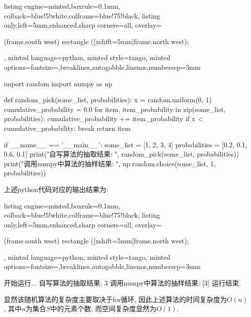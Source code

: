 \documentclass{article}
\begin{document}
\begin{homeworkProblem}
\begin{tcblisting}{listing engine=minted,boxrule=0.1mm,
colback=blue!5!white,colframe=blue!75!black,
listing only,left=5mm,enhanced,sharp corners=all,
overlay={\begin{tcbclipinterior} (frame.south west)
rectangle ([xshift=5mm]frame.north west);\end{tcbclipinterior}},
minted language=python,
minted style=tango,
minted options={fontsize=\small,breaklines,autogobble,linenos,numbersep=3mm}}
import random
import numpy as np
 
def random_pick(some_list, probabilities):
    x = random.uniform(0, 1)
    cumulative_probability = 0.0
    for item, item_probability in zip(some_list, probabilities):
        cumulative_probability += item_probability
        if x < cumulative_probability: break
    return item

if __name__ == '__main__':
    some_list = [1, 2, 3, 4]
    probabilities = [0.2, 0.1, 0.6, 0.1]
    print("自写算法的抽取结果: ", random_pick(some_list, probabilities))
    print("调用numpy中算法的抽样结果: ", np.random.choice(some_list, 1, probabilities))
\end{tcblisting}
上述python代码对应的输出结果为:
\begin{tcblisting}{listing engine=minted,boxrule=0.1mm,
colback=blue!5!white,colframe=blue!75!black,
listing only,left=5mm,enhanced,sharp corners=all,
overlay={\begin{tcbclipinterior} (frame.south west)
rectangle ([xshift=5mm]frame.north west);\end{tcbclipinterior}},
minted language=python,
minted style=tango,
minted options={fontsize=\small,breaklines,autogobble,linenos,numbersep=3mm}}
开始运行...
自写算法的抽取结果: 3
调用numpy中算法的抽样结果: [3]
运行结束.
\end{tcblisting}
	显然该随机算法的复杂度主要取决于for循环, 因此上述算法的时间复杂度为$O(n)$, 其中$n$为集合$S$中的元素个数. 而空间复杂度显然为$O(1)$.

\end{homeworkProblem}
\end{document}
